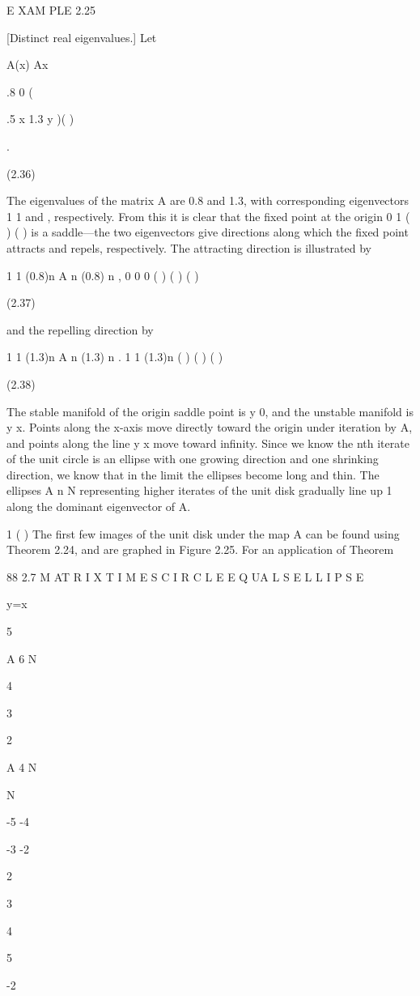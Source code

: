 \documentclass[12pt]{article}
\begin{document}
E XAM PLE 2.25

[Distinct real eigenvalues.] Let

A(x)  Ax 

.8 0 (

.5 x 1.3 y )( )

.

(2.36)

The eigenvalues of the matrix A are 0.8 and 1.3, with corresponding eigenvectors 1 1 and , respectively. From this it is clear that 
the ﬁxed point at the origin 0 1 ( ) ( ) is a saddle—the two eigenvectors give directions along which the ﬁxed point attracts and 
repels, respectively. The attracting direction is illustrated by

1 1 (0.8)n  A n  (0.8) n  , 0 0 0 ( ) ( ) ( )

(2.37)

and the repelling direction by

1 1 (1.3)n  A n  (1.3) n  . 1 1 (1.3)n  ( ) ( ) ( )

(2.38)

The stable manifold of the origin saddle point is y  0, and the unstable manifold is y  x. Points along the x-axis move directly 
toward the origin under iteration by A, and points along the line y  x move toward inﬁnity. Since we know the nth iterate of the 
unit circle is an ellipse with one growing direction and one shrinking direction, we know that in the limit the ellipses become long 
and thin. The ellipses A n N representing higher iterates of the unit disk gradually line up 1 along the dominant eigenvector of A.

1 ( ) The ﬁrst few images of the unit disk under the map A can be found using Theorem 2.24, and are graphed in Figure 2.25. For an 
application of Theorem

88 2.7 M AT R I X T I M E S C I R C L E E Q UA L S E L L I P S E

y=x

5

A 6 N

4

3

2

A 4 N

N

-5 -4

-3 -2

2

3

4

5

-2
\end{document}
